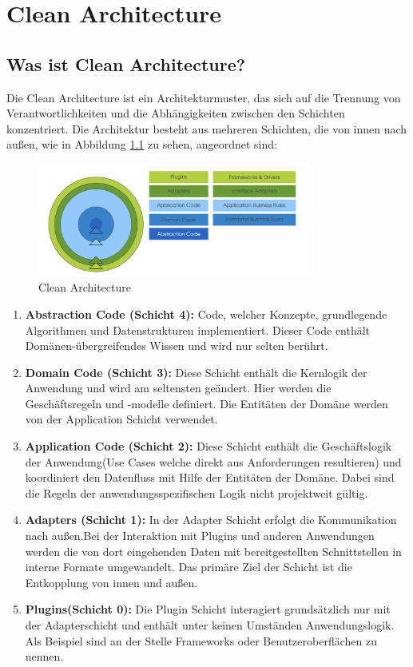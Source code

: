 \chapter{Clean Architecture}
\section{Was ist Clean Architecture?}
Die Clean Architecture ist ein Architekturmuster, das sich auf die Trennung von Verantwortlichkeiten und die Abhängigkeiten zwischen den Schichten konzentriert. Die Architektur besteht aus mehreren Schichten, die von innen nach außen, wie in Abbildung \ref{fig:cleanArchitecture} zu sehen, angeordnet sind:

\begin{figure}[h]
    \centering
    \includegraphics[width=0.8\textwidth]{Bilder/CA.png}
    \caption{Clean Architecture \cite{clean.2023}}
    \label{fig:cleanArchitecture}
\end{figure}

\begin{enumerate}
    \item \textbf{Abstraction Code (Schicht 4):} Code, welcher Konzepte, grundlegende Algorithmen und Datenstrukturen implementiert. Dieser Code enthält Domänen-übergreifendes Wissen und wird nur selten berührt.
    \item \textbf{Domain Code (Schicht 3):} Diese Schicht enthält die Kernlogik der Anwendung und wird am seltensten geändert. Hier werden die Geschäftsregeln und -modelle definiert. Die Entitäten der Domäne  werden von der Application Schicht verwendet.
    \item \textbf{Application Code (Schicht 2):} Diese Schicht enthält die Geschäftslogik der Anwendung(Use Cases welche direkt aus Anforderungen resultieren) und koordiniert den Datenfluss mit Hilfe der Entitäten der Domäne. Dabei sind die Regeln der anwendungsspezifischen Logik nicht projektweit gültig.  
    \item \textbf{Adapters (Schicht 1):} In der Adapter Schicht erfolgt die Kommunikation nach außen.Bei der Interaktion mit Plugins und anderen Anwendungen werden die von dort eingehenden Daten mit bereitgestellten Schnittstellen in interne Formate umgewandelt. Das primäre Ziel der Schicht ist die Entkopplung von innen und außen.
    \item \textbf{Plugins(Schicht 0):} Die Plugin Schicht interagiert grundsätzlich nur mit der Adapterschicht und enthält unter keinen Umständen Anwendungslogik. Als Beispiel sind an der Stelle Frameworks oder Benutzeroberflächen zu nennen.
\end{enumerate}

